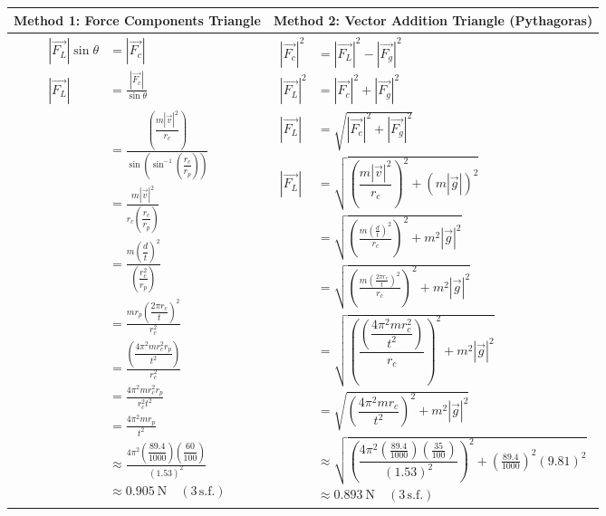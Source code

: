 \documentclass[11pt, a4paper]{article}
\begin{document}
	\begin{table}[H]
		\begin{tabularx}{\textwidth}{c|c}
			Method 1: Force Components Triangle
			&
			Method 2: Vector Addition Triangle (Pythagoras)\\
			\hline
			\parbox{0.4\textwidth}{
			\begin{align}
				|\vec{F_L}|\sin \theta &= |\vec{F_c}|\\
				|\vec{F_L}|&=\frac{|\vec{F_c}|}{\sin \theta}\\
				&=\frac{\left(\dfrac{m|\vec{v}|^2}{r_c}\right)}{\sin \left(\sin^{-1}\left(\dfrac{r_c}{r_p}\right)\right)}\\
				&=\frac{m|\vec{v}|^2}{r_c\left(\dfrac{r_c}{r_p}\right)}\\
				&=\frac{m\left(\dfrac{d}{t}\right)^2}{\left(\dfrac{r_c^2}{r_p}\right)}\\
				&=\frac{mr_p\left(\dfrac{2\pi r_c}{t}\right)^2}{r_c^2}\\
				&=\frac{\left(\dfrac{4\pi^2mr_c^2r_p}{t^2}\right)}{r_c^2}\\
				&=\frac{4\pi^2mr_c^2r_p}{r_c^2t^2}\\
				&=\frac{4\pi^2mr_p}{t^2}\\
				&\approx\frac{4\pi^2\left(\dfrac{89.4}{1000}\right)\left(\dfrac{60}{100}\right)}{(1.53)^2}\\
				&\approx\SI{0.905}{\newton} \quad (3\, \text{s.f.})
			\end{align}
			}
			&
			\parbox{0.55\textwidth}{
			\begin{align}
				|\vec{F_c}|^2&=|\vec{F_L}|^2-|\vec{F_g}|^2\\
				|\vec{F_L}|^2&=|\vec{F_c}|^2+|\vec{F_g}|^2\\
				|\vec{F_L}|&=\sqrt{\left|\vec{F_c}\right|^2+\left|\vec{F_g}\right|^2}\\
				|\vec{F_L}|&=\sqrt{\left(\dfrac{m|\vec{v}|^2}{r_c}\right)^2+(m|\vec{g}|)^2}\\
				&=\sqrt{\left(\frac{m\left(\frac{d}{t}\right)^2}{r_c}\right)^2+m^2|\vec{g}|^2}\\
				&=\sqrt{\left(\frac{m\left(\frac{2\pi r_c}{t}\right)^2}{r_c}\right)^2+m^2|\vec{g}|^2}\\
				&=\sqrt{\left(\dfrac{\left(\dfrac{4\pi^2 mr_c^2}{t^2}\right)}{r_c}\right)^2+m^2|\vec{g}|^2}\\
				&=\sqrt{\left(\dfrac{4\pi^2 mr_c}{t^2}\right)^2+m^2|\vec{g}|^2}\\
				&\approx\sqrt{\left(\dfrac{4\pi^2 \left(\frac{89.4}{1000}\right)\left(\frac{35}{100}\right)}{(1.53)^2}\right)^2+\left(\frac{89.4}{1000}\right)^2(9.81)^2}\\
				&\approx\SI{0.893}{\newton} \quad (3\, \text{s.f.})
			\end{align}
			}\\ \hline
		\end{tabularx}
	\end{table}
\end{document}
